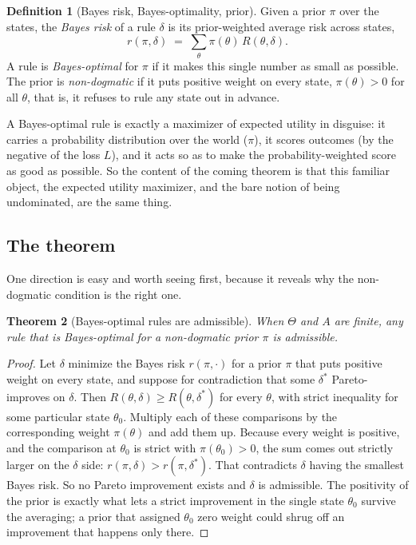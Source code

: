 \documentclass[10pt]{article}
\newtheorem{theorem}{Theorem}[section]
\theoremstyle{definition}
\newtheorem{definition}[theorem]{Definition}
\theoremstyle{remark}
\begin{document}
\begin{definition}[Bayes risk, Bayes-optimality, prior]
\label{def:bayes}
Given a prior $\pi$ over the states, the \emph{Bayes risk} of a rule $\delta$ is its prior-weighted average risk across states,
\[
r(\pi, \delta) \;=\; \sum_{\theta} \pi(\theta)\, R(\theta, \delta).
\]
A rule is \emph{Bayes-optimal} for $\pi$ if it makes this single number as small as possible. The prior is \emph{non-dogmatic} if it puts positive weight on every state, $\pi(\theta) > 0$ for all $\theta$, that is, it refuses to rule any state out in advance.
\end{definition}

A Bayes-optimal rule is exactly a maximizer of expected utility in disguise: it carries a probability distribution over the world ($\pi$), it scores outcomes (by the negative of the loss $L$), and it acts so as to make the probability-weighted score as good as possible. So the content of the coming theorem is that this familiar object, the expected utility maximizer, and the bare notion of being undominated, are the same thing.

\subsection{The theorem}

One direction is easy and worth seeing first, because it reveals why the non-dogmatic condition is the right one.

\begin{theorem}[Bayes-optimal rules are admissible]
\label{thm:cc-easy}
When $\Theta$ and $A$ are finite, any rule that is Bayes-optimal for a non-dogmatic prior $\pi$ is admissible.
\end{theorem}

\begin{proof}
Let $\delta$ minimize the Bayes risk $r(\pi, \cdot)$ for a prior $\pi$ that puts positive weight on every state, and suppose for contradiction that some $\delta^*$ Pareto-improves on $\delta$. Then $R(\theta, \delta) \ge R(\theta, \delta^*)$ for every $\theta$, with strict inequality for some particular state $\theta_0$. Multiply each of these comparisons by the corresponding weight $\pi(\theta)$ and add them up. Because every weight is positive, and the comparison at $\theta_0$ is strict with $\pi(\theta_0) > 0$, the sum comes out strictly larger on the $\delta$ side: $r(\pi, \delta) > r(\pi, \delta^*)$. That contradicts $\delta$ having the smallest Bayes risk. So no Pareto improvement exists and $\delta$ is admissible. The positivity of the prior is exactly what lets a strict improvement in the single state $\theta_0$ survive the averaging; a prior that assigned $\theta_0$ zero weight could shrug off an improvement that happens only there.
\end{proof}
\end{document}
